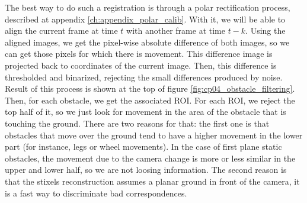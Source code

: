 The best way to do such a registration is through a polar rectification process, described at appendix \ref{ch:appendix_polar_calib}. With it, we will be able to align the current frame at time $t$ with another frame at time $t - k$. Using the aligned images, we get the pixel-wise absolute difference of both images, so we can get those pixels for which there is movement. This difference image is projected back to coordinates of the current image. Then, this difference is thresholded and binarized, rejecting the small differences produced by noise. Result of this process is shown at the top of figure \ref{fig:cp04_obstacle_filtering}. Then, for each obstacle, we get the associated \ac{ROI}. For each \ac{ROI}, we reject the top half of it, so we just look for movement in the area of the obstacle that is touching the ground. There are two reasons for that: the first one is that obstacles that move over the ground tend to have a higher movement in the lower part (for instance, legs or wheel movements). In the case of first plane static obstacles, the movement due to the camera change is more or less similar in the upper and lower half, so we are not loosing information. The second reason is that the stixels reconstruction assumes a planar ground in front of the camera, it is a fast way to discriminate bad correspondences.

